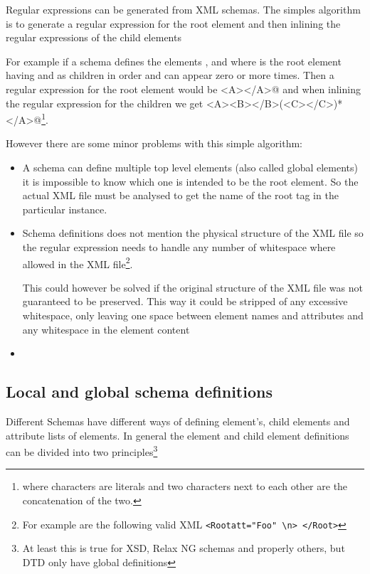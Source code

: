 \documentclass[a4paper, oneside]{memoir}
\theoremstyle{definition}
\begin{document}
Regular expressions can be generated from XML schemas. The simples algorithm is
to generate a regular expression for the root element and then inlining the
regular expressions of the child elements

For example if a schema defines the elements \verb@A@, \verb@B@ and \verb@C@
where \verb@A@ is the root element having \verb@B@ and \verb@C@ as children in
order and \verb@C@ can appear zero or more times. Then a regular expression for
the root element would be \verb@<A></A>@ and when inlining the regular
expression for the children we get
\verb@<A><B></B>(<C></C>)*</A>@\footnote{where characters are literals and two
  characters next to each other are the concatenation of the two.}.
  
  However there are some minor problems with this simple algorithm:

  \begin{itemize}
  \item A schema can define multiple top level elements (also called global
    elements) it is impossible to know which one is intended to be the root
    element. So the actual XML file must be analysed to get the name of the root
    tag in the particular instance.

  \item Schema definitions does not mention the physical structure of the XML
    file so the regular expression needs to handle any number of whitespace
    where allowed in the XML file\footnote{For example are the following valid
      XML \texttt{<Root{\textvisiblespace}att="Foo"\textvisiblespace%
        \textvisiblespace\textbackslash{n}\textvisiblespace>\textvisiblespace%
        </Root\textvisiblespace\textvisiblespace>}}.

    This could however be solved if the original structure of the XML file was
    not guaranteed to be preserved. This way it could be stripped of any
    excessive whitespace, only leaving one space between element names and
    attributes and any whitespace in the element content

  \item 

  \end{itemize}

\subsection{Local and global schema definitions}
\label{sec:local-global-schema-definitions}
Different Schemas have different ways of defining element's, child elements and
attribute lists of elements. In general the element and child element
definitions can be divided into two principles\footnote{At least this is true for
  XSD, Relax NG schemas and properly others, but DTD only have global definitions}
\end{document}
